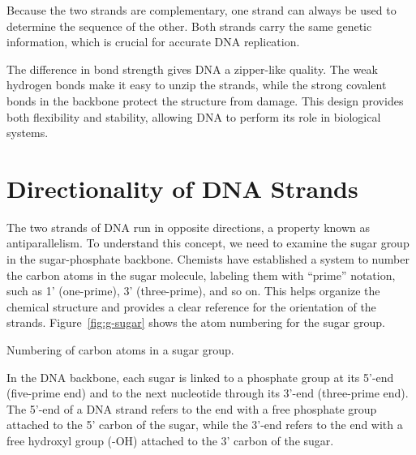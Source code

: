 Because the two strands are complementary, one strand can always be used to determine the sequence of the other. Both strands carry the same genetic information, which is crucial for accurate DNA replication.

The difference in bond strength gives DNA a zipper-like quality. The weak hydrogen bonds make it easy to unzip the strands, while the strong covalent bonds in the backbone protect the structure from damage. This design provides both flexibility and stability, allowing DNA to perform its role in biological systems.

\section{Directionality of DNA Strands}

The two strands of DNA run in opposite directions, a property known as antiparallelism. To understand this concept, we need to examine the sugar group in the sugar-phosphate backbone. Chemists have established a system to number the carbon atoms in the sugar molecule, labeling them with ``prime'' notation, such as 1' (one-prime), 3' (three-prime), and so on. This helps organize the chemical structure and provides a clear reference for the orientation of the strands. Figure~\ref{fig:g-sugar} shows the atom numbering for the sugar group.

\begin{marginfigure}
  \caption[6pt]{Numbering of carbon atoms in a sugar group.}
  \label{fig:g-sugar}
\end{marginfigure}

In the DNA backbone, each sugar is linked to a phosphate group at its 5'-end (five-prime end) and to the next nucleotide through its 3'-end (three-prime end). The 5'-end of a DNA strand refers to the end with a free phosphate group attached to the 5' carbon of the sugar, while the 3'-end refers to the end with a free hydroxyl group (-OH) attached to the 3' carbon of the sugar.

